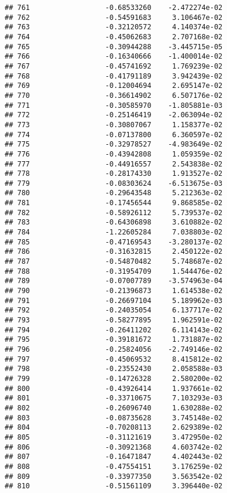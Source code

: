 \documentclass[
]{article}
\begin{document}
\begin{verbatim}
## 761                  -0.68533260    -2.472274e-02
## 762                  -0.54591683     3.106467e-02
## 763                  -0.32120572     4.140374e-02
## 764                  -0.45062683     2.707168e-02
## 765                  -0.30944288    -3.445715e-05
## 766                  -0.16340666    -1.400014e-02
## 767                  -0.45741692     1.769239e-02
## 768                  -0.41791189     3.942439e-02
## 769                  -0.12004694     2.695147e-02
## 770                  -0.36614902     6.507176e-02
## 771                  -0.30585970    -1.805881e-03
## 772                  -0.25146419    -2.063094e-02
## 773                  -0.30807067     1.158377e-02
## 774                  -0.07137800     6.360597e-02
## 775                  -0.32978527    -4.983649e-02
## 776                  -0.43942808     1.059359e-02
## 777                  -0.44916557     2.543838e-02
## 778                  -0.28174330     1.913527e-02
## 779                  -0.08303624    -6.513675e-03
## 780                  -0.29643548     5.212363e-02
## 781                  -0.17456544     9.868585e-02
## 782                  -0.58926112     5.739537e-02
## 783                  -0.64306898     3.610882e-02
## 784                  -1.22605284     7.038803e-02
## 785                  -0.47169543    -3.280137e-02
## 786                  -0.31632815     2.450122e-02
## 787                  -0.54870482     5.748687e-02
## 788                  -0.31954709     1.544476e-02
## 789                  -0.07007789    -3.574963e-04
## 790                  -0.21396873     1.614538e-02
## 791                  -0.26697104     5.189962e-03
## 792                  -0.24035054     6.137717e-02
## 793                  -0.58277895     1.962591e-02
## 794                  -0.26411202     6.114143e-02
## 795                  -0.39181672     1.731887e-02
## 796                  -0.25824056    -2.749146e-02
## 797                  -0.45069532     8.415812e-02
## 798                  -0.23552430     2.058588e-03
## 799                  -0.14726328     2.580200e-02
## 800                  -0.43926414     1.937661e-02
## 801                  -0.33710675     7.103293e-03
## 802                  -0.26096740     1.630288e-02
## 803                  -0.08735628     3.745148e-02
## 804                  -0.70208113     2.629389e-02
## 805                  -0.31121619     3.472950e-02
## 806                  -0.30921368     4.603742e-02
## 807                  -0.16471847     4.402443e-02
## 808                  -0.47554151     3.176259e-02
## 809                  -0.33977350     3.563542e-02
## 810                  -0.51561109     3.396440e-02

\end{verbatim}
\end{document}
